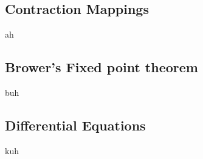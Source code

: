 \dotfill
\begin{multicols}{2}
\section*{Contraction Mappings\vspace{-3ex}}
ah
\end{multicols}

\begin{multicols}{2}
\subsection*{Brower's Fixed point theorem\vspace{-3ex}}
buh
\end{multicols}


\begin{multicols}{2}
\subsection*{Differential Equations\vspace{-3ex}}
kuh
\end{multicols}